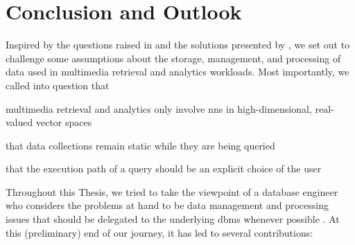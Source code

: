 \chapter{Conclusion and Outlook}
\label{chapter:conclusion}

Inspired by the questions raised in \cite{Jonsson:2016Ten} and the solutions presented by \cite{Giangreco:2018Database}, we set out to challenge some assumptions about the storage, management, and processing of data used in multimedia retrieval and analytics workloads. Most importantly, we called into question that 
\begin{enumerate*}[label=(\roman*), itemjoin={{, }}, itemjoin*={{, and }}, after={{.}}]
    \item multimedia retrieval and analytics only involve \acrshort{nns} in high-dimensional, real-valued vector spaces
    \item that data collections remain static while they are being queried
    \item that  the execution path of a query should be an explicit choice of the user
\end{enumerate*} 
Throughout this Thesis, we tried to take the viewpoint of a database engineer who considers the problems at hand to be data management and processing issues that should be delegated to the underlying \acrshort{dbms} whenever possible \cite{Ferro:2014Bridging,Amsaleg:2014Database}. At this (preliminary) end of our journey, it has led to several contributions:

